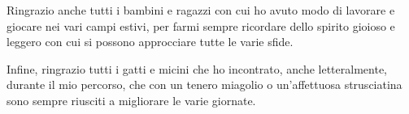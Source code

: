 \documentclass[12pt,	%
	a4paper,		%
	twoside,		%
	openright,		%
	titlepage,%
	]{book}
\theoremstyle{definition}
\begin{document}
Ringrazio anche tutti i bambini e ragazzi con cui ho avuto modo di lavorare e giocare nei vari campi estivi, per farmi sempre ricordare dello spirito gioioso e leggero con cui si possono approcciare tutte le varie sfide.

\newpage
Infine, ringrazio tutti i gatti e micini che ho incontrato, anche letteralmente, durante il mio percorso, che con un tenero miagolio o un'affettuosa strusciatina sono sempre riusciti a migliorare le varie giornate.




\end{document}
